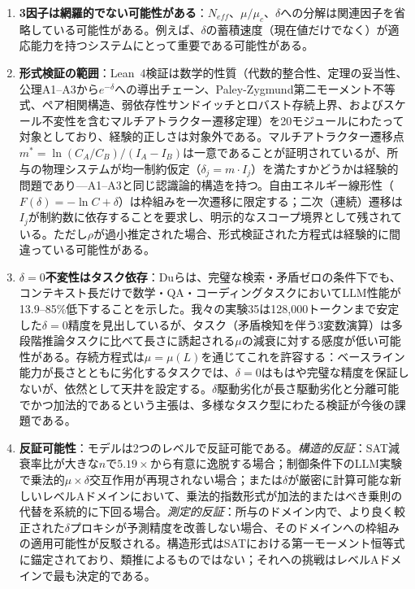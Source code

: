 \documentclass[11pt,a4paper]{article}
\begin{document}
\begin{enumerate}
    \item \textbf{3因子は網羅的でない可能性がある}：$N_{eff}$、$\mu/\mu_c$、$\delta$への分解は関連因子を省略している可能性がある。例えば、$\delta$の蓄積速度（現在値だけでなく）が適応能力を持つシステムにとって重要である可能性がある。

    \item \textbf{形式検証の範囲}：Lean~4検証は数学的性質（代数的整合性、定理の妥当性、公理A1--A3から$e^{-\delta}$への導出チェーン、Paley-Zygmund第二モーメント不等式、ペア相関構造、弱依存性サンドイッチとロバスト存続上界、およびスケール不変性を含むマルチアトラクター遷移定理）を20モジュールにわたって対象としており、経験的正しさは対象外である。マルチアトラクター遷移点$m^* = \ln(C_A/C_B)/(I_A - I_B)$は一意であることが証明されているが、所与の物理システムが均一制約仮定（$\delta_j = m \cdot I_j$）を満たすかどうかは経験的問題であり---A1--A3と同じ認識論的構造を持つ。自由エネルギー線形性（$F(\delta) = -\ln C + \delta$）は枠組みを一次遷移に限定する；二次（連続）遷移は$I_j$が制約数に依存することを要求し、明示的なスコープ境界として残されている。ただし$\rho$が過小推定された場合、形式検証された方程式は経験的に間違っている可能性がある。

    \item \textbf{$\delta = 0$不変性はタスク依存}：Duら\cite{du2025contextlength}は、完璧な検索・矛盾ゼロの条件下でも、コンテキスト長だけで数学・QA・コーディングタスクにおいてLLM性能が13.9--85\%低下することを示した。我々の実験35は128{,}000トークンまで安定した$\delta = 0$精度を見出しているが、タスク（矛盾検知を伴う3変数演算）は多段階推論タスクに比べて長さに誘起される$\mu$の減衰に対する感度が低い可能性がある。存続方程式は$\mu = \mu(L)$を通じてこれを許容する：ベースライン能力が長さとともに劣化するタスクでは、$\delta = 0$はもはや完璧な精度を保証しないが、依然として天井を設定する。$\delta$駆動劣化が長さ駆動劣化と分離可能でかつ加法的であるという主張は、多様なタスク型にわたる検証が今後の課題である。

    \item \textbf{反証可能性}：モデルは2つのレベルで反証可能である。\emph{構造的反証}：SAT減衰率比が大きな$n$で$5.19\times$から有意に逸脱する場合；制御条件下のLLM実験で乗法的$\mu \times \delta$交互作用が再現されない場合；または$\delta$が厳密に計算可能な新しいレベルAドメインにおいて、乗法的指数形式が加法的またはべき乗則の代替を系統的に下回る場合。\emph{測定的反証}：所与のドメイン内で、より良く較正された$\delta$プロキシが予測精度を改善しない場合、そのドメインへの枠組みの適用可能性が反駁される。構造形式はSATにおける第一モーメント恒等式に錨定されており、類推によるものではない；それへの挑戦はレベルAドメインで最も決定的である。
\end{enumerate}
\end{document}
